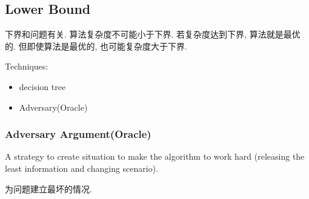 \subsection{Lower Bound}
下界和问题有关. 算法复杂度不可能小于下界. 若复杂度达到下界, 算法就是最优的. 但即使算法是最优的, 也可能复杂度大于下界. 

Techniques:
\begin{itemize}
    \item decision tree
    \item Adversary(Oracle)
\end{itemize}

\subsubsection{Adversary Argument(Oracle)}
\begin{definition}[Adversary]
    A strategy to create situation to make the algorithm to work hard (releasing the least information and changing scenario).
\end{definition}

为问题建立最坏的情况. 

